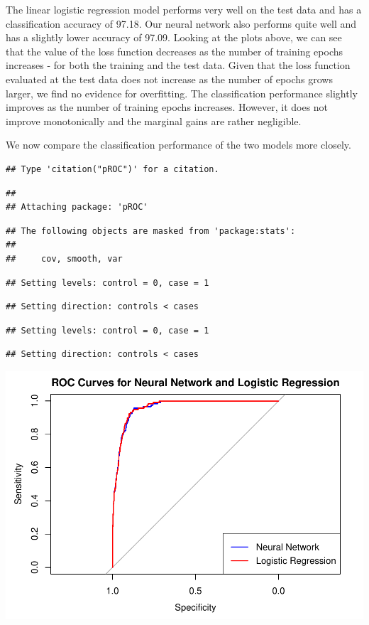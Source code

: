\documentclass[
]{article}
\begin{document}
The linear logistic regression model performs very well on the test data
and has a classification accuracy of 97.18. Our neural network also
performs quite well and has a slightly lower accuracy of 97.09. Looking
at the plots above, we can see that the value of the loss function
decreases as the number of training epochs increases - for both the
training and the test data. Given that the loss function evaluated at
the test data does not increase as the number of epochs grows larger, we
find no evidence for overfitting. The classification performance
slightly improves as the number of training epochs increases. However,
it does not improve monotonically and the marginal gains are rather
negligible.

We now compare the classification performance of the two models more
closely.

\begin{verbatim}
## Type 'citation("pROC")' for a citation.
\end{verbatim}

\begin{verbatim}
## 
## Attaching package: 'pROC'
\end{verbatim}

\begin{verbatim}
## The following objects are masked from 'package:stats':
## 
##     cov, smooth, var
\end{verbatim}

\begin{verbatim}
## Setting levels: control = 0, case = 1
\end{verbatim}

\begin{verbatim}
## Setting direction: controls < cases
\end{verbatim}

\begin{verbatim}
## Setting levels: control = 0, case = 1
\end{verbatim}

\begin{verbatim}
## Setting direction: controls < cases
\end{verbatim}

\includegraphics{A4_files/figure-latex/unnamed-chunk-12-1.pdf}
\end{document}
